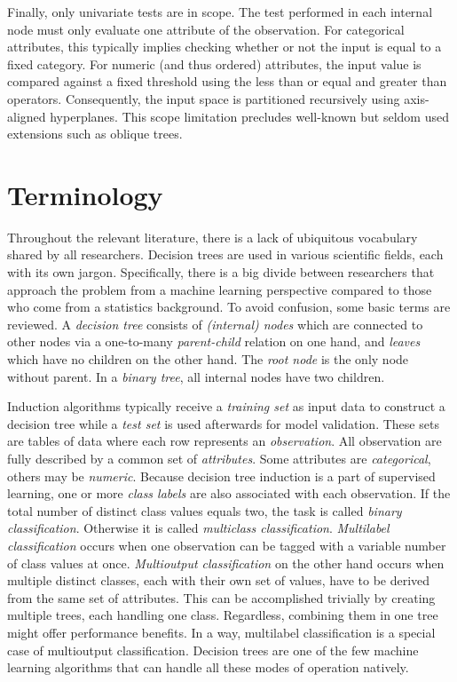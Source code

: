 Finally, only univariate tests are in scope. The test performed in each internal node must only evaluate one attribute of the observation. For categorical attributes, this typically implies checking whether or not the input is equal to a fixed category. For numeric (and thus ordered) attributes, the input value is compared against a fixed threshold using the less than or equal and greater than operators. Consequently, the input space is partitioned recursively using axis-aligned hyperplanes. This scope limitation precludes well-known but seldom used extensions such as oblique trees.


\section{Terminology}
Throughout the relevant literature, there is a lack of ubiquitous vocabulary shared by all researchers. Decision trees are used in various scientific fields, each with its own jargon. Specifically, there is a big divide between researchers that approach the problem from a machine learning perspective compared to those who come from a statistics background. To avoid confusion, some basic terms are reviewed. A \emph{decision tree} consists of \emph{(internal) nodes} which are connected to other nodes via a one-to-many \emph{parent-child} relation on one hand, and \emph{leaves} which have no children on the other hand. The \emph{root node} is the only node without parent. In a \emph{binary tree}, all internal nodes have two children.

Induction algorithms typically receive a \emph{training set} as input data to construct a decision tree while a \emph{test set} is used afterwards for model validation. These sets are tables of data where each row represents an \emph{observation}. All observation are fully described by a common set of \emph{attributes}. Some attributes are \emph{categorical}, others may be \emph{numeric}. Because decision tree induction is a part of supervised learning, one or more \emph{class labels} are also associated with each observation. If the total number of distinct class values equals two, the task is called \emph{binary classification}. Otherwise it is called \emph{multiclass classification}. \emph{Multilabel classification} occurs when one observation can be tagged with a variable number of class values at once. \emph{Multioutput classification} on the other hand occurs when multiple distinct classes, each with their own set of values, have to be derived from the same set of attributes. This can be accomplished trivially by creating multiple trees, each handling one class. Regardless, combining them in one tree might offer performance benefits. In a way, multilabel classification is a special case of multioutput classification. Decision trees are one of the few machine learning algorithms that can handle all these modes of operation natively.

